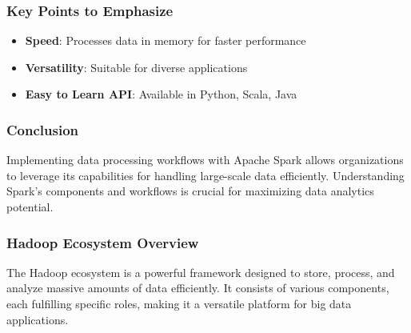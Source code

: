\documentclass[aspectratio=169]{beamer}
\begin{document}
\begin{frame}[fragile]
    \frametitle{Key Points to Emphasize}
    \begin{itemize}
        \item \textbf{Speed}: Processes data in memory for faster performance
        \item \textbf{Versatility}: Suitable for diverse applications
        \item \textbf{Easy to Learn API}: Available in Python, Scala, Java
    \end{itemize}
\end{frame}

\begin{frame}[fragile]
    \frametitle{Conclusion}
    Implementing data processing workflows with Apache Spark allows organizations to leverage its capabilities for handling large-scale data efficiently. Understanding Spark's components and workflows is crucial for maximizing data analytics potential.
\end{frame}

\begin{frame}[fragile]
    \frametitle{Hadoop Ecosystem Overview}
    The Hadoop ecosystem is a powerful framework designed to store, process, and analyze massive amounts of data efficiently. It consists of various components, each fulfilling specific roles, making it a versatile platform for big data applications.
\end{frame}
\end{document}
